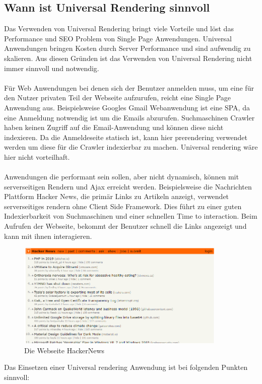 \documentclass[runningheads]{llncs}
\begin{document}
\subsection{Wann ist Universal Rendering sinnvoll}
\label{subsec:Wann ist Universal Rendering sinnvoll}
Das Verwenden von Universal Rendering bringt viele Vorteile und 
löst das Performance und SEO Problem von Single Page Anwendungen. 
Universal Anwendungen bringen Kosten durch Server Performance und sind aufwendig zu skalieren. 
Aus diesen Gründen ist das Verwenden von Universal Rendering nicht immer sinnvoll und notwendig.
\\
\\
Für Web Anwendungen bei denen sich der Benutzer anmelden muss, 
um eine für den Nutzer privaten Teil der Webseite aufzurufen, 
reicht eine Single Page Anwendung aus. 
Beispielsweise Googles Gmail Webanwendung ist eine SPA, 
da eine Anmeldung notwendig ist um die Emails abzurufen. 
Suchmaschinen Crawler haben keinen Zugriff auf die Email-Anwendung und 
können diese nicht indexieren. 
Da die Anmeldeseite statisch ist, 
kann hier prerendering verwendet werden um diese für die Crawler indexierbar zu machen. 
Universal rendering wäre hier nicht vorteilhaft.
\\
\\
Anwendungen die performant sein sollen, 
aber nicht dynamisch, können mit serverseitigen Rendern und 
Ajax erreicht werden. Beispielsweise die Nachrichten Plattform Hacker News, 
die primär Links zu Artikeln anzeigt, 
verwendet serverseitiges rendern ohne Client Side Framework. 
Dies führt zu einer guten Indexierbarkeit von Suchmaschinen und 
einer schnellen Time to interaction. Beim Aufrufen der Webseite, 
bekommt der Benutzer schnell die Links angezeigt und 
kann mit ihnen interagieren. 
\begin{figure}
  \centering
  \includegraphics[width=10cm]{images/HackerNews}
  \caption{Die Webseite HackerNews}
  \label{Die WEbseite HackerNews}
\end{figure}
Das Einsetzen einer Universal rendering Anwendung ist bei folgenden Punkten sinnvoll: 
\end{document}

